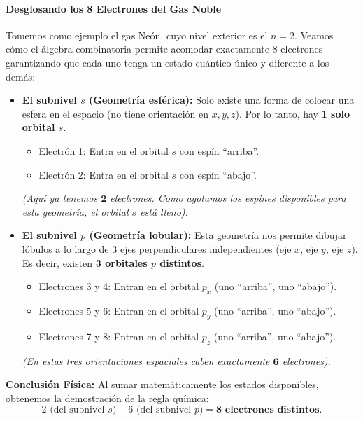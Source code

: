 \documentclass[11pt,a4paper]{book}
\begin{document}
\paragraph{Desglosando los 8 Electrones del Gas Noble}
Tomemos como ejemplo el gas Neón, cuyo nivel exterior es el $n=2$. Veamos cómo el álgebra combinatoria permite acomodar exactamente $8$ electrones garantizando que cada uno tenga un estado cuántico único y diferente a los demás:

\begin{itemize}
    \item \textbf{El subnivel $s$ (Geometría esférica):} 
    Solo existe una forma de colocar una esfera en el espacio (no tiene orientación en $x, y, z$). Por lo tanto, hay \textbf{1 solo orbital $s$}.
    \begin{itemize}
        \item Electrón 1: Entra en el orbital $s$ con espín ``arriba''.
        \item Electrón 2: Entra en el orbital $s$ con espín ``abajo''.
    \end{itemize}
    \textit{(Aquí ya tenemos $\mathbf{2}$ electrones. Como agotamos los espines disponibles para esta geometría, el orbital $s$ está lleno).}

    \item \textbf{El subnivel $p$ (Geometría lobular):} 
    Esta geometría nos permite dibujar lóbulos a lo largo de 3 ejes perpendiculares independientes (eje $x$, eje $y$, eje $z$). Es decir, existen \textbf{3 orbitales $p$ distintos}.
    \begin{itemize}
        \item Electrones 3 y 4: Entran en el orbital $p_x$ (uno ``arriba'', uno ``abajo'').
        \item Electrones 5 y 6: Entran en el orbital $p_y$ (uno ``arriba'', uno ``abajo'').
        \item Electrones 7 y 8: Entran en el orbital $p_z$ (uno ``arriba'', uno ``abajo'').
    \end{itemize}
    \textit{(En estas tres orientaciones espaciales caben exactamente $\mathbf{6}$ electrones).}
\end{itemize}

\textbf{Conclusión Física:}
Al sumar matemáticamente los estados disponibles, obtenemos la demostración de la regla química:
\begin{equation}
    2 \text{ (del subnivel } s) + 6 \text{ (del subnivel } p) = \mathbf{8 \text{ electrones distintos}}.
\end{equation}
\end{document}
